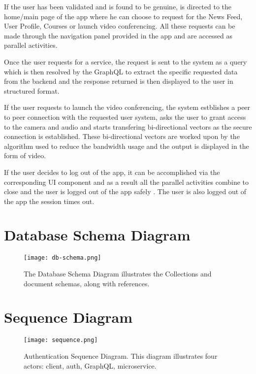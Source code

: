 If the user has been validated and is found to be genuine, is directed to the home/main page of the app where he can choose to request for the News Feed, User Profile, Courses or launch video conferencing.
All these requests can be made through the navigation panel provided in the app and are accessed as parallel activities.

Once the user requests for a service, the request is sent to the system as a query which is then resolved by the GraphQL to extract the specific requested data from the backend and the response returned is then displayed to the user in structured format.

If the user requests to launch the video conferencing, the system estblishes a peer to peer connection with the requested user system, asks the user to grant access to the camera and audio and starts transfering bi-directional vectors as the secure connection is established.
These bi-directional vectors are worked upon by the algorithm used to reduce the bandwidth usage and the output is displayed in the form of video.

If the user decides to log out of the app, it can be accomplished via the corresponding UI component and as a result all the parallel activities combine to close and the user is logged out of the app safely .
The user is also logged out of the app the session times out.





\section{Database Schema Diagram}

\begin{figure}[h!]
    \centering
    \texttt{[image: db-schema.png]}
    \caption{The Database Schema Diagram illustrates the Collections and document schemas, along with references.}
\end{figure}

\section{Sequence Diagram}

\begin{figure}[h!]
    \begin{center}
        \texttt{[image: sequence.png]}
    \end{center}
    \caption{Authentication Sequence Diagram. This diagram illustrates four actors: client, auth, GraphQL, microservice.}
    \label{fig:sequence}
\end{figure}

